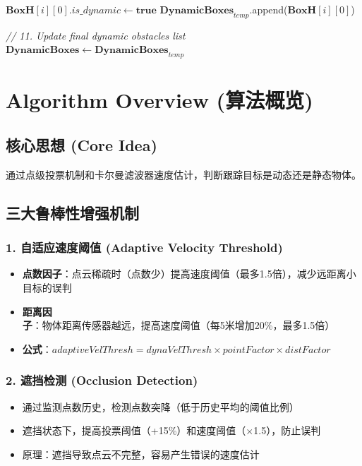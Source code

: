 \documentclass[14pt,a4paper]{article}
\begin{document}
\begin{algorithm}
\begin{algorithmic}[1]
            \State $\mathbf{BoxH}[i][0].is\_dynamic \gets \textbf{true}$
            \State $\mathbf{DynamicBoxes}_{temp}$.append($\mathbf{BoxH}[i][0]$)
        \EndIf
    \EndIf
    
\EndFor

\State \textit{// 11. Update final dynamic obstacles list}
\State $\mathbf{DynamicBoxes} \gets \mathbf{DynamicBoxes}_{temp}$

\end{algorithmic}
\end{algorithm}

\newpage

\section*{Algorithm Overview (算法概览)}

\subsection*{核心思想 (Core Idea)}
通过点级投票机制和卡尔曼滤波器速度估计，判断跟踪目标是动态还是静态物体。

\subsection*{三大鲁棒性增强机制}

\subsubsection*{1. 自适应速度阈值 (Adaptive Velocity Threshold)}
\begin{itemize}
    \item \textbf{点数因子}：点云稀疏时（点数少）提高速度阈值（最多1.5倍），减少远距离小目标的误判
    \item \textbf{距离因子}：物体距离传感器越远，提高速度阈值（每5米增加20\%，最多1.5倍）
    \item \textbf{公式}：$adaptiveVelThresh = dynaVelThresh \times pointFactor \times distFactor$
\end{itemize}

\subsubsection*{2. 遮挡检测 (Occlusion Detection)}
\begin{itemize}
    \item 通过监测点数历史，检测点数突降（低于历史平均的阈值比例）
    \item 遮挡状态下，提高投票阈值（+15\%）和速度阈值（×1.5），防止误判
    \item 原理：遮挡导致点云不完整，容易产生错误的速度估计
\end{itemize}
\end{document}
